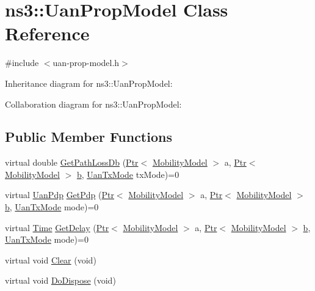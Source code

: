 \hypertarget{classns3_1_1UanPropModel}{}\section{ns3\+:\+:Uan\+Prop\+Model Class Reference}
\label{classns3_1_1UanPropModel}


{\ttfamily \#include $<$uan-\/prop-\/model.\+h$>$}



Inheritance diagram for ns3\+:\+:Uan\+Prop\+Model\+:


Collaboration diagram for ns3\+:\+:Uan\+Prop\+Model\+:
\subsection*{Public Member Functions}
\begin{DoxyCompactItemize}
\item 
virtual double \hyperlink{classns3_1_1UanPropModel_accd9e37015a7b4ccdda06ee4fef8395c}{Get\+Path\+Loss\+Db} (\hyperlink{classns3_1_1Ptr}{Ptr}$<$ \hyperlink{classns3_1_1MobilityModel}{Mobility\+Model} $>$ a, \hyperlink{classns3_1_1Ptr}{Ptr}$<$ \hyperlink{classns3_1_1MobilityModel}{Mobility\+Model} $>$ \hyperlink{lte__pathloss_8m_a21ad0bd836b90d08f4cf640b4c298e7c}{b}, \hyperlink{classns3_1_1UanTxMode}{Uan\+Tx\+Mode} tx\+Mode)=0
\item 
virtual \hyperlink{classns3_1_1UanPdp}{Uan\+Pdp} \hyperlink{classns3_1_1UanPropModel_ac53ea299d241019b37c8cf252083b631}{Get\+Pdp} (\hyperlink{classns3_1_1Ptr}{Ptr}$<$ \hyperlink{classns3_1_1MobilityModel}{Mobility\+Model} $>$ a, \hyperlink{classns3_1_1Ptr}{Ptr}$<$ \hyperlink{classns3_1_1MobilityModel}{Mobility\+Model} $>$ \hyperlink{lte__pathloss_8m_a21ad0bd836b90d08f4cf640b4c298e7c}{b}, \hyperlink{classns3_1_1UanTxMode}{Uan\+Tx\+Mode} mode)=0
\item 
virtual \hyperlink{classns3_1_1Time}{Time} \hyperlink{classns3_1_1UanPropModel_a448249193b58518f238da34e12dcaacd}{Get\+Delay} (\hyperlink{classns3_1_1Ptr}{Ptr}$<$ \hyperlink{classns3_1_1MobilityModel}{Mobility\+Model} $>$ a, \hyperlink{classns3_1_1Ptr}{Ptr}$<$ \hyperlink{classns3_1_1MobilityModel}{Mobility\+Model} $>$ \hyperlink{lte__pathloss_8m_a21ad0bd836b90d08f4cf640b4c298e7c}{b}, \hyperlink{classns3_1_1UanTxMode}{Uan\+Tx\+Mode} mode)=0
\item 
virtual void \hyperlink{classns3_1_1UanPropModel_ad7b4090057ef03c1294258993931b41b}{Clear} (void)
\item 
virtual void \hyperlink{classns3_1_1UanPropModel_a0d3b228d239c7cd26e0dbdfe60e637f1}{Do\+Dispose} (void)
\end{DoxyCompactItemize}
